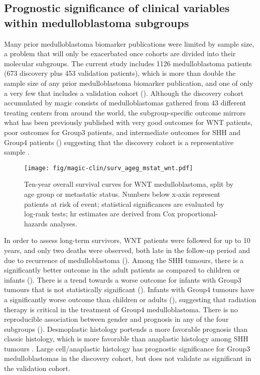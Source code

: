 \subsection{Prognostic significance of clinical variables within medulloblastoma subgroups}

Many prior medulloblastoma biomarker publications were limited by sample size, a problem that will only be exacerbated once cohorts are divided into their molecular subgroups. The current study includes 1126 medulloblastoma patients (673 discovery plus 453 validation patients), which is more than double the sample size of any prior medulloblastoma biomarker publication, and one of only a very few that includes a validation cohort (). Although the discovery cohort accumulated by \gls{magic} consists of medulloblastomas gathered from 43 different treating centers from around the world, the subgroup-specific outcome mirrors what has been previously published with very good outcomes for WNT patients, poor outcomes for Group3 patients, and intermediate outcomes for SHH and Group4 patients () suggesting that the discovery cohort is a representative sample .

\begin{figure}[h]
	\begin{center}
		\texttt{[image: fig/magic-clin/surv\_ageg\_mstat\_wnt.pdf]}
	\end{center}
	\caption[Ten-year overall survival curves for WNT medulloblastoma]
	{
	Ten-year overall survival curves for WNT medulloblastoma, split by age group or metastatic status.
	Numbers below x-axis represent patients at risk of event; statistical significances are evaluated by log-rank tests; \gls{hr} estimates are derived from Cox proportional-hazards analyses.
	}
	\label{fig:surv_ageg_mstat_wnt}
\end{figure}

In order to assess long-term survivors, WNT patients were followed for up to 10 years, and only two deaths were observed, both late in the follow-up period and due to recurrence of medulloblastoma (). Among the SHH tumours, there is a significantly better outcome in the adult patients as compared to children or infants (). There is a trend towards a worse outcome for infants with Group3 tumours that is not statistically significant (). Infants with Group4 tumours have a significantly worse outcome than children or adults (), suggesting that radiation therapy is critical in the treatment of Group4 medulloblastoma. There is no reproducible association between gender and prognosis in any of the four subgroups (). Desmoplastic histology portends a more favorable prognosis than classic histology, which is more favorable than anaplastic histology among SHH tumours . Large cell/anaplastic histology has prognostic significance for Group3 medulloblastomas in the discovery cohort, but does not validate as significant in the validation cohort.

